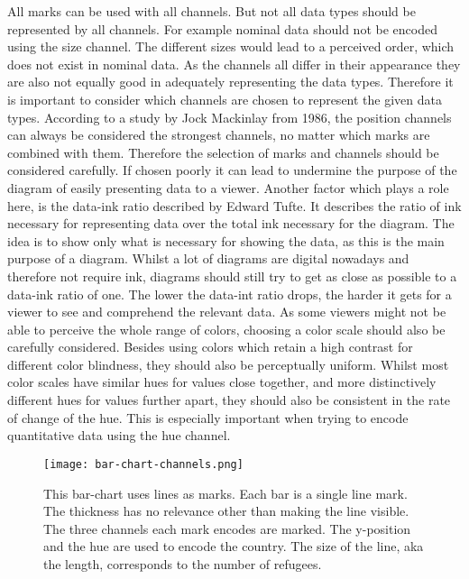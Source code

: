 All marks can be used with all channels. But not all data types should be represented by all channels. For example nominal data should not be encoded using the size channel. The different sizes would lead to a perceived order, which does not exist in nominal data. As the channels all differ in their appearance they are also not equally good in adequately representing the data types. Therefore it is important to consider which channels are chosen to represent the given data types. According to a study by Jock Mackinlay from 1986, the position channels can always be considered the strongest channels, no matter which marks are combined with them\cite{mackinlay1986automating}. Therefore the selection of marks and channels should be considered carefully. If chosen poorly it can lead to undermine the purpose of the diagram of easily presenting data to a viewer.
Another factor which plays a role here, is the data-ink ratio described by Edward Tufte\cite{tufte}. It describes the ratio of ink necessary for representing data over the total ink necessary for the diagram. The idea is to show only what is necessary for showing the data, as this is the main purpose of a diagram. Whilst a lot of diagrams are digital nowadays and therefore not require ink, diagrams should still try to get as close as possible to a data-ink ratio of one. The lower the data-int ratio drops, the harder it gets for a viewer to see and comprehend the relevant data.
As some viewers might not be able to perceive the whole range of colors, choosing a color scale should also be carefully considered. Besides using colors which retain a high contrast for different color blindness, they should also be perceptually uniform. Whilst most color scales have similar hues for values close together, and more distinctively different hues for values further apart, they should also be consistent in the rate of change of the hue. This is especially important when trying to encode quantitative data using the hue channel.

\begin{figure}
    \texttt{[image: bar-chart-channels.png]}
    \captionsetup{width=0.9\textwidth}
    \caption[bar-chart]{This bar-chart uses lines as marks. Each bar is a single line mark. The thickness has no relevance other than making the line visible. The three channels each mark encodes are marked. The y-position and the hue are used to encode the country. The size of the line, aka the length, corresponds to the number of refugees.}
    \label{fig:bar-chart}
\end{figure}

